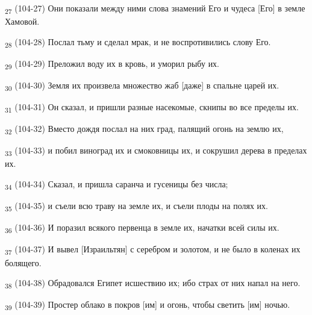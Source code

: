 \begin{tcolorbox}
\textsubscript{27} (104-27) Они показали между ними слова знамений Его и чудеса [Его] в земле Хамовой.
\end{tcolorbox}
\begin{tcolorbox}
\textsubscript{28} (104-28) Послал тьму и сделал мрак, и не воспротивились слову Его.
\end{tcolorbox}
\begin{tcolorbox}
\textsubscript{29} (104-29) Преложил воду их в кровь, и уморил рыбу их.
\end{tcolorbox}
\begin{tcolorbox}
\textsubscript{30} (104-30) Земля их произвела множество жаб [даже] в спальне царей их.
\end{tcolorbox}
\begin{tcolorbox}
\textsubscript{31} (104-31) Он сказал, и пришли разные насекомые, скнипы во все пределы их.
\end{tcolorbox}
\begin{tcolorbox}
\textsubscript{32} (104-32) Вместо дождя послал на них град, палящий огонь на землю их,
\end{tcolorbox}
\begin{tcolorbox}
\textsubscript{33} (104-33) и побил виноград их и смоковницы их, и сокрушил дерева в пределах их.
\end{tcolorbox}
\begin{tcolorbox}
\textsubscript{34} (104-34) Сказал, и пришла саранча и гусеницы без числа;
\end{tcolorbox}
\begin{tcolorbox}
\textsubscript{35} (104-35) и съели всю траву на земле их, и съели плоды на полях их.
\end{tcolorbox}
\begin{tcolorbox}
\textsubscript{36} (104-36) И поразил всякого первенца в земле их, начатки всей силы их.
\end{tcolorbox}
\begin{tcolorbox}
\textsubscript{37} (104-37) И вывел [Израильтян] с серебром и золотом, и не было в коленах их болящего.
\end{tcolorbox}
\begin{tcolorbox}
\textsubscript{38} (104-38) Обрадовался Египет исшествию их; ибо страх от них напал на него.
\end{tcolorbox}
\begin{tcolorbox}
\textsubscript{39} (104-39) Простер облако в покров [им] и огонь, чтобы светить [им] ночью.
\end{tcolorbox}
